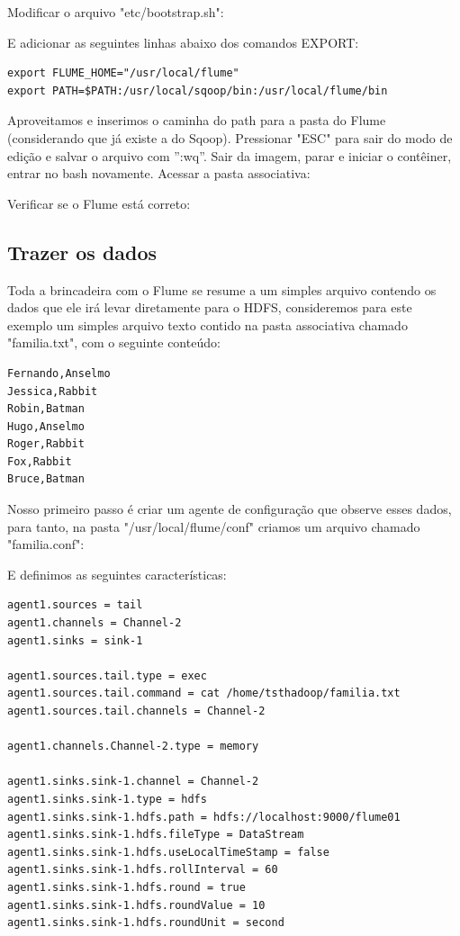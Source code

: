 \documentclass[a4paper,11pt]{article}
\begin{document}
Modificar o arquivo "etc/bootstrap.sh":

E adicionar as seguintes linhas abaixo dos comandos EXPORT:
\begin{lstlisting}[]
export FLUME_HOME="/usr/local/flume"
export PATH=$PATH:/usr/local/sqoop/bin:/usr/local/flume/bin
\end{lstlisting}

Aproveitamos e inserimos o caminha do path para a pasta do Flume (considerando que já existe a do Sqoop). Pressionar "ESC" para sair do modo de edição e salvar o arquivo com ”:wq”. Sair da imagem, parar e iniciar o contêiner, entrar no bash novamente. Acessar a pasta associativa: \\

Verificar se o Flume está correto: \\

\subsection{Trazer os dados}
Toda a brincadeira com o Flume se resume a um simples arquivo contendo os dados que ele irá levar diretamente para o HDFS, consideremos para este exemplo um simples arquivo texto contido na pasta associativa chamado "familia.txt", com o seguinte conteúdo:
\begin{lstlisting}[]
Fernando,Anselmo
Jessica,Rabbit
Robin,Batman
Hugo,Anselmo
Roger,Rabbit
Fox,Rabbit
Bruce,Batman
\end{lstlisting}

Nosso primeiro passo é criar um agente de configuração que observe esses dados, para tanto, na pasta "/usr/local/flume/conf" criamos um arquivo chamado "familia.conf":

E definimos as seguintes características:
\begin{lstlisting}[]
agent1.sources = tail
agent1.channels = Channel-2
agent1.sinks = sink-1

agent1.sources.tail.type = exec
agent1.sources.tail.command = cat /home/tsthadoop/familia.txt
agent1.sources.tail.channels = Channel-2

agent1.channels.Channel-2.type = memory

agent1.sinks.sink-1.channel = Channel-2
agent1.sinks.sink-1.type = hdfs
agent1.sinks.sink-1.hdfs.path = hdfs://localhost:9000/flume01
agent1.sinks.sink-1.hdfs.fileType = DataStream
agent1.sinks.sink-1.hdfs.useLocalTimeStamp = false
agent1.sinks.sink-1.hdfs.rollInterval = 60
agent1.sinks.sink-1.hdfs.round = true
agent1.sinks.sink-1.hdfs.roundValue = 10
agent1.sinks.sink-1.hdfs.roundUnit = second
\end{lstlisting}
\end{document}
